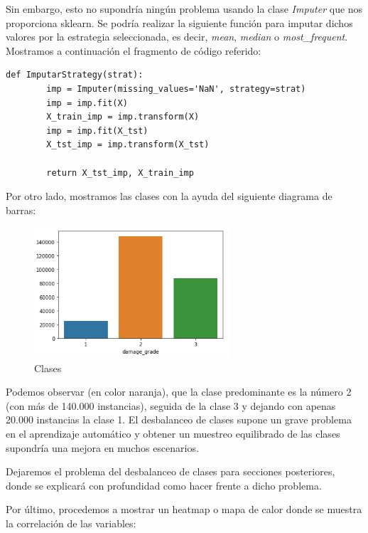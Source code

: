 Sin embargo, esto no supondría ningún problema usando la clase \textit{Imputer} que nos proporciona sklearn. Se podría realizar la siguiente función para imputar dichos valores por la estrategia seleccionada, es decir, \textit{mean}, \textit{median} o \textit{most\_frequent}. \\
Mostramos a continuación el fragmento de código referido: \\

	\begin{lstlisting}[frame=single]
def ImputarStrategy(strat):
		imp = Imputer(missing_values='NaN', strategy=strat)
		imp = imp.fit(X)
		X_train_imp = imp.transform(X)
		imp = imp.fit(X_tst)
		X_tst_imp = imp.transform(X_tst)
	
		return X_tst_imp, X_train_imp\end{lstlisting}	
		

Por otro lado, mostramos las clases con la ayuda del siguiente diagrama de barras:


\begin{figure}[H]
	\centering
	\includegraphics[width=0.65\textwidth]{img/grade.png}
	\caption{Clases}
\end{figure}


Podemos observar (en color naranja), que la clase predominante es la número 2 (con más de 140.000 instancias), seguida de la clase 3 y dejando con apenas 20.000 instancias la clase 1. El desbalanceo de clases supone un grave problema en el aprendizaje automático y obtener un muestreo equilibrado de las clases supondría una mejora en muchos escenarios. \hfill

Dejaremos el problema del desbalanceo de clases para secciones posteriores, donde se explicará con profundidad como hacer frente a dicho problema.

\newpage
Por último, procedemos a mostrar un heatmap o mapa de calor donde se muestra la correlación de las variables:

